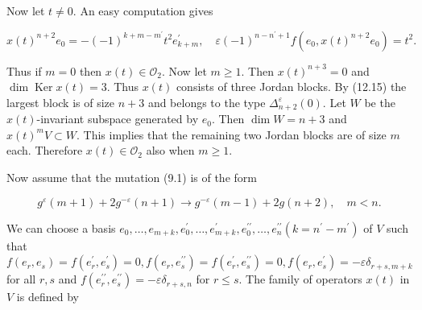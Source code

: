 \documentclass[10pt]{article}
\begin{document}
Now let $t \neq 0$. An easy computation gives


\begin{equation*}
x(t)^{n+2} e_{0}=-(-1)^{k+m-m^{\prime}} t^{2} e_{k+m}^{\prime}, \quad \varepsilon(-1)^{n-n^{\prime}+1} f\left(e_{0}, x(t)^{n+2} e_{0}\right)=t^{2} . \tag{12.15}
\end{equation*}


Thus if $m=0$ then $x(t) \in \mathcal{O}_{2}$. Now let $m \geqslant 1$. Then $x(t)^{n+3}=0$ and $\operatorname{dim} \operatorname{Ker} x(t)=3$. Thus $x(t)$ consists of three Jordan blocks. By (12.15) the largest block is of size $n+3$ and belongs to the type $\Delta_{n+2}^{\varepsilon}(0)$. Let $W$ be the $x(t)$-invariant subspace generated by $e_{0}$. Then $\operatorname{dim} W=n+3$ and $x(t)^{m} V \subset W$. This implies that the remaining two Jordan blocks are of size $m$ each. Therefore $x(t) \in \mathcal{O}_{2}$ also when $m \geqslant 1$.

Now assume that the mutation (9.1) is of the form


\begin{equation*}
g^{\varepsilon}(m+1)+2 g^{-\varepsilon}(n+1) \rightarrow g^{-\varepsilon}(m-1)+2 g(n+2), \quad m<n . \tag{12.16}
\end{equation*}


We can choose a basis $e_{0}, \ldots, e_{m+k}, e_{0}^{\prime}, \ldots, e_{m+k}^{\prime}, e_{0}^{\prime \prime}, \ldots, e_{n}^{\prime \prime}\left(k=n^{\prime}-m^{\prime}\right)$ of $V$ such that $f\left(e_{r}, e_{s}\right)=f\left(e_{r}^{\prime}, e_{s}^{\prime}\right)=0, f\left(e_{r}, e_{s}^{\prime \prime}\right)=f\left(e_{r}^{\prime}, e_{s}^{\prime \prime}\right)=0, f\left(e_{r}, e_{s}^{\prime}\right)=-\varepsilon \delta_{r+s, m+k}$ for all $r, s$ and $f\left(e_{r}^{\prime \prime}, e_{s}^{\prime \prime}\right)=-\varepsilon \delta_{r+s, n}$ for $r \leqslant s$. The family of operators $x(t)$ in $V$ is defined by
\end{document}

